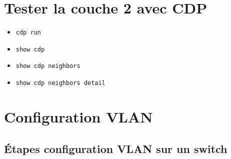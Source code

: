 \documentclass[a4paper]{article}
\begin{document}
\section{Tester la couche 2 avec CDP}



\begin{itemize}[label=\textbf{–}]
    \item \texttt{cdp run}
    \item \texttt{show cdp}
    \item \texttt{show cdp neighbors}
    \item \texttt{show cdp neighbors detail}
\end{itemize}










\section{Configuration VLAN}





\subsection{Étapes configuration VLAN sur un switch}
\end{document}
